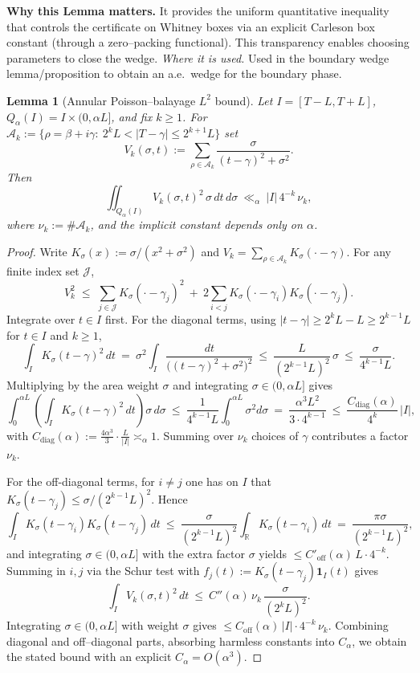 \documentclass[11pt]{article}
\newtheorem{lemma}{Lemma}[section]
\theoremstyle{definition}
\theoremstyle{remark}
\newcommand{\R}{\mathbb{R}}
\begin{document}
  \vspace{1.0cm}
\noindent\textbf{Why this Lemma matters.} It provides the uniform quantitative inequality that controls the certificate on Whitney boxes via an explicit Carleson box constant (through a zero--packing functional). This transparency enables choosing parameters to close the wedge.
\noindent\textit{Where it is used.} Used in the boundary wedge lemma/proposition to obtain an a.e.\ wedge for the boundary phase.
\begin{lemma}[Annular Poisson–balayage $L^2$ bound]
\label{lem:annular-balayage}
Let $I=[T-L,T+L]$, $Q_\alpha(I)=I\times(0,\alpha L]$, and fix $k\ge1$. For
$\mathcal A_k:=\{\rho=\beta+i\gamma:\ 2^kL<|T-\gamma|\le 2^{k+1}L\}$ set
\[
  V_k(\sigma,t):=\sum_{\rho\in\mathcal A_k}\frac{\sigma}{(t-\gamma)^2+\sigma^2}.
\]
Then
\[
  \iint_{Q_\alpha(I)} V_k(\sigma,t)^2\,\sigma\,dt\,d\sigma\ \ll_\alpha\ |I|\,4^{-k}\,\nu_k,
\]
where $\nu_k:=\#\mathcal A_k$, and the implicit constant depends only on $\alpha$.
\end{lemma}
\begin{proof}
Write $K_\sigma(x):=\sigma/(x^2+\sigma^2)$ and $V_k=\sum_{\rho\in\mathcal A_k}K_\sigma(\cdot-\gamma)$. For any finite index set $\mathcal J$,
\[
  V_k^2\;\le\; \sum_{j\in\mathcal J} K_\sigma(\cdot-\gamma_j)^2\ +\ 2\!\!\sum_{i<j} K_\sigma(\cdot-\gamma_i)K_\sigma(\cdot-\gamma_j).
\]
Integrate over $t\in I$ first. For the diagonal terms, using $|t-\gamma|\ge 2^kL-L\ge 2^{k-1}L$ for $t\in I$ and $k\ge 1$,
\[
 \int_I K_\sigma(t-\gamma)^2\,dt\ =\ \sigma^2\!\int_I \frac{dt}{\big((t-\gamma)^2+\sigma^2\big)^2}\ \le\ \frac{L}{(2^{k-1}L)^2}\,\sigma\ \le\ \frac{\sigma}{4^{k-1}L}.
\]
Multiplying by the area weight $\sigma$ and integrating $\sigma\in(0,\alpha L]$ gives
\[
 \int_0^{\alpha L}\!\!\left(\int_I K_\sigma(t-\gamma)^2\,dt\right)\sigma\,d\sigma\ \le\ \frac{1}{4^{k-1}L}\int_0^{\alpha L}\!\sigma^2 d\sigma\ =\ \frac{\alpha^3 L^2}{3\cdot 4^{k-1}}\ \le\ \frac{C_{\mathrm{diag}}(\alpha)}{4^{k}}\,|I|,
\]
with $C_{\mathrm{diag}}(\alpha):=\tfrac{4\alpha^3}{3}\cdot\tfrac{L}{|I|}\asymp_\alpha 1$. Summing over $\nu_k$ choices of $\gamma$ contributes a factor $\nu_k$.

For the off-diagonal terms, for $i\ne j$ one has on $I$ that $K_\sigma(t-\gamma_j)\le \sigma/(2^{k-1}L)^2$. Hence
\[
 \int_I K_\sigma(t-\gamma_i)K_\sigma(t-\gamma_j)\,dt\ \le\ \frac{\sigma}{(2^{k-1}L)^2}\int_\R K_\sigma(t-\gamma_i)\,dt\ =\ \frac{\pi\sigma}{(2^{k-1}L)^2},
\]
and integrating $\sigma\in(0,\alpha L]$ with the extra factor $\sigma$ yields $\le C'_{\mathrm{off}}(\alpha)\,L\cdot 4^{-k}$. Summing in $i,j$ via the Schur test with $f_j(t):=K_\sigma(t-\gamma_j)\mathbf 1_I(t)$ gives
\[
 \int_I V_k(\sigma,t)^2\,dt\ \le\ C''(\alpha)\,\nu_k\,\frac{\sigma}{(2^kL)^2}.
\]
Integrating $\sigma\in(0,\alpha L]$ with weight $\sigma$ gives $\le C_{\mathrm{off}}(\alpha)\,|I|\cdot 4^{-k}\,\nu_k$. Combining diagonal and off–diagonal parts, absorbing harmless constants into $C_\alpha$, we obtain the stated bound with an explicit $C_\alpha=O(\alpha^3)$.
\end{proof}
\end{document}
